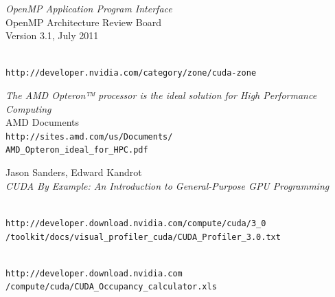 \documentclass[9pt,twocolumn]{scrartcl}
\begin{document}
\begin{thebibliography}{12345}


	\textit{OpenMP Application Program Interface}	\\
	OpenMP Architecture Review Board	\\
	Version 3.1, July 2011

	\hfill\\
	\texttt{\smaller http://developer.nvidia.com/category/zone/cuda-zone}
	
	\textit{The AMD Opteron™ processor is the ideal solution for High Performance Computing}\\
	AMD Documents\\
	\texttt{\smaller http://sites.amd.com/us/Documents/\\AMD\_Opteron\_ideal\_for\_HPC.pdf}

	Jason Sanders, Edward Kandrot	\\
	\textit{CUDA By Example: An Introduction to General-Purpose GPU Programming}

	\hfill\\
	\texttt{\smaller http://developer.download.nvidia.com/compute/cuda/3\_0\\/toolkit/docs/visual\_profiler\_cuda/CUDA\_Profiler\_3.0.txt}

	\hfill\\
	\texttt{http://developer.download.nvidia.com\\/compute/cuda/CUDA\_Occupancy\_calculator.xls}
\end{thebibliography}
\end{document}
